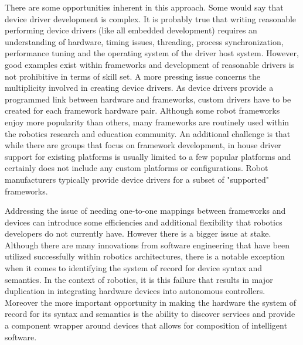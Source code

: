 There are some opportunities inherent in this approach.   Some would say that device driver development is complex.  It is probably true that writing reasonable performing device drivers (like all embedded development) requires an understanding of hardware, timing issues, threading, process synchronization, performance tuning and the operating system of the driver host system.  However, good examples exist within frameworks and development of reasonable drivers is not prohibitive in terms of skill set.   A more pressing issue concerns the multiplicity involved in creating device drivers.  As device drivers provide a programmed link between hardware and frameworks, custom drivers have to be created for each framework hardware pair.  Although some robot frameworks enjoy more popularity than others, many frameworks are routinely used within the robotics research and education community.   An additional challenge is that while there are groups that focus on framework development, in house driver support for existing platforms is usually limited to a few popular platforms and certainly does not include any custom platforms or configurations.  Robot manufacturers typically provide device drivers for a subset of "supported" frameworks.

Addressing the issue of needing one-to-one mappings between frameworks and devices can introduce some efficiencies and additional flexibility that robotics developers do not currently have.  However there is a bigger issue at stake.  Although there are many innovations from software engineering that have been utilized successfully within robotics architectures, there is a notable exception when it comes to identifying the system of record for device syntax and semantics.  In the context of robotics, it is this failure that results in major duplication in integrating hardware devices into autonomous controllers.   Moreover the more important opportunity in making the hardware the system of record for its syntax and semantics is the ability to discover services and provide a component wrapper around devices that allows for composition of intelligent software.


